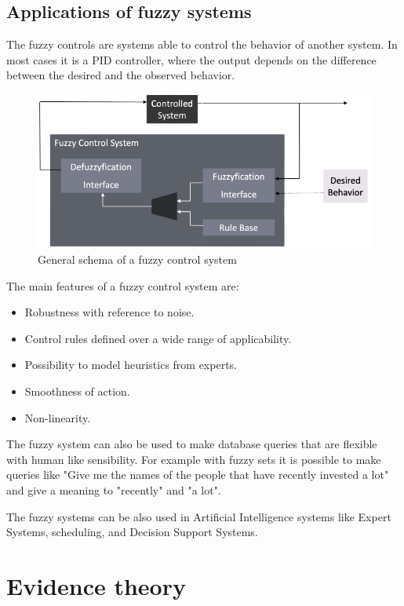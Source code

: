 \documentclass[12pt, a4paper]{report}
\newtheorem[style=M,bodystyle=\normalfont]{theorem}{Theorem}
\newtheorem[style=M,bodystyle=\normalfont]{corollary}{Corollary}
\newtheorem[style=M,bodystyle=\normalfont]{lemma}{Lemma}
\newtheorem[style=M,bodystyle=\normalfont]{definition}{Definition}
\begin{document}
    \section{Applications of fuzzy systems}
    The fuzzy controls are systems able to control the behavior of another system. In most cases it is a PID controller, where the output
    depends on the difference between the desired and the observed behavior. 
    \begin{figure}[H]
        \centering
        \includegraphics[width=0.5\linewidth]{images/control.png}
        \caption{General schema of a fuzzy control system}
    \end{figure}
    The main features of a fuzzy control system are: 
    \begin{itemize}
        \item Robustness with reference to noise.
        \item Control rules defined over a wide range of applicability.
        \item Possibility to model heuristics from experts.
        \item Smoothness of action.
        \item Non-linearity.
    \end{itemize}

    The fuzzy system can also be used to make database queries that are flexible with human like sensibility. For example with fuzzy sets it
    is possible to make queries like "Give me the names of the people that have recently invested a lot" and give a meaning to "recently" and 
    "a lot". 

    The fuzzy systems can be also used in Artificial Intelligence systems like Expert Systems, scheduling, and Decision Support Systems.

    \newpage

    \chapter{Evidence theory}
\end{document}
